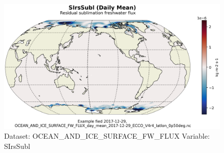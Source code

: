 \begin{figure}[H]
\centering
\includegraphics[scale=0.55]{../images/plots/latlon_plots/Ocean_and_Sea-Ice_Surface_Freshwater_Fluxes/SIrsSubl.png}
\caption{Dataset: OCEAN\_AND\_ICE\_SURFACE\_FW\_FLUX Variable: SIrsSubl}
\label{tab:table-OCEAN_AND_ICE_SURFACE_FW_FLUX_SIrsSubl-Plot}
\end{figure}
\pagebreak

